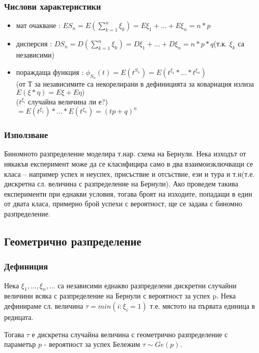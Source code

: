 \documentclass[fleqn,12pt]{article}
\begin{document}
\begin{justify}
\subsubsection{Числови характеристики}  
\begin{itemize}
    \item мат очакване : $ES_n = E(\sum_{k=1}^n \xi_k) = E\xi_1 + \dots + E\xi_n = n*p$
    \item дисперсия : $DS_n = D(\sum_{k=1}^n \xi_k) = D\xi_1 + \dots + D\xi_n = n*p*q$(т.к. $\xi_k$ са независими)
    \item пораждаща функция : $\phi_{S_n}(t) = E(t^{S_n}) = E(t^{\xi_1} * \dots * t^{\xi_n})$ \\
    (от Т за независимите са некорелирани в дефиницията за ковариация излиза $E(\xi*\eta) = E\xi + E\eta)$ \\
    ($t^{\xi_i}$ случайна величина ли е?) \\
    $=E(t^{\xi_1}) * \dots * E(t^{\xi_n}) = (tp + q)^n$ 
\end{itemize}

\subsubsection{Използване} 
Биномното разпределение моделира т.нар. схема на Бернули. Нека изходът от някакъв експеримент може да се класифицира
само в два взаимоизключващи се класа – например успех и неуспех, присъствие и отсъствие, ези и тура и т.н(т.е. дискретна
сл. величина с разпределение на Бернули). Ако проведем такива експерименти при еднакви условия, тогава броят на
изходите, попадащи в един от двата класа, примерно брой успехи с вероятност, ще се задава с биномно разпределение.

\subsection{Геометрично разпределение}
\subsubsection{Дефиниция} 
Нека $\xi_1, \dots, \xi_n, \dots$ са независими еднакво разпределени дискретни случайни величини всяка с разпределение 
на Бернули с вероятност за успех p.
Нека дефинираме сл. величина $\tau = min(i : \xi_i = 1)$ т.е. мястото на първата единица в редицата. 

Тогава $\tau$ е 
дискретна случайна величина с геометрично разпределение с параметър $p$ - вероятност за успех Бележим $\tau \sim Ge(p)$.


\end{justify}
\end{document}

